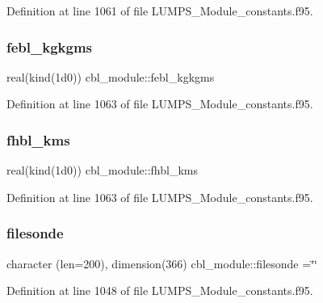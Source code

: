 Definition at line 1061 of file L\+U\+M\+P\+S\+\_\+\+Module\+\_\+constants.\+f95.

\mbox{\label{namespacecbl__module_a5b2329a6a103326f5fa08282787d83aa}} 
\subsubsection{\texorpdfstring{febl\+\_\+kgkgms}{febl\_kgkgms}}
{\footnotesize\ttfamily real(kind(1d0)) cbl\+\_\+module\+::febl\+\_\+kgkgms}



Definition at line 1063 of file L\+U\+M\+P\+S\+\_\+\+Module\+\_\+constants.\+f95.

\mbox{\label{namespacecbl__module_a3bb0811c2c1eb194eff7132bb1a906ef}} 
\subsubsection{\texorpdfstring{fhbl\+\_\+kms}{fhbl\_kms}}
{\footnotesize\ttfamily real(kind(1d0)) cbl\+\_\+module\+::fhbl\+\_\+kms}



Definition at line 1063 of file L\+U\+M\+P\+S\+\_\+\+Module\+\_\+constants.\+f95.

\mbox{\label{namespacecbl__module_a810011542edd41ab403379b2004c84ab}} 
\subsubsection{\texorpdfstring{filesonde}{filesonde}}
{\footnotesize\ttfamily character (len=200), dimension(366) cbl\+\_\+module\+::filesonde =\char`\"{}\char`\"{}}



Definition at line 1048 of file L\+U\+M\+P\+S\+\_\+\+Module\+\_\+constants.\+f95.

\mbox{\label{namespacecbl__module_a976e376b24178298356c3ffba35082f8}} 
